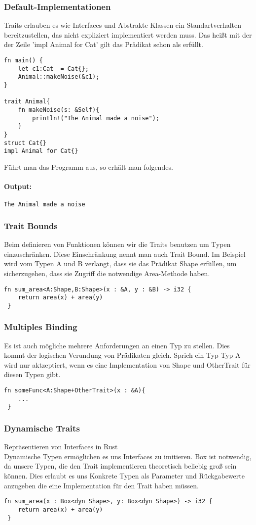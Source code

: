 \documentclass[a4paper, 1ppt]{article}
\begin{document}
\subsubsection{Default-Implementationen}
Traits erlauben es wie Interfaces und Abstrakte Klassen ein Standartverhalten bereitzustellen, das nicht expliziert implementiert werden muss.
Das heißt mit der der Zeile 'impl Animal for Cat{}' gilt das Prädikat schon als erfüllt.
\begin{verbatim}
fn main() {
    let c1:Cat  = Cat{};
    Animal::makeNoise(&c1);
}

trait Animal{
    fn makeNoise(s: &Self){
        println!("The Animal made a noise");
    }
}
struct Cat{}
impl Animal for Cat{}
\end{verbatim}
Führt man das Programm aus, so erhält man folgendes.
\paragraph{Output:}
\begin{verbatim}
The Animal made a noise
\end{verbatim}
\subsubsection{Trait Bounds}
Beim definieren von Funktionen können wir die Traits benutzen um Typen einzuschränken. Diese Einschränkung nennt man auch Trait Bound.
Im Beispiel wird vom Typen A und B  verlangt, dass sie das Prädikat Shape erfüllen, um sicherzugehen, dass sie Zugriff die notwendige Area-Methode haben.
\begin{verbatim}
fn sum_area<A:Shape,B:Shape>(x : &A, y : &B) -> i32 {
    return area(x) + area(y)
 }
\end{verbatim}
\subsubsection{Multiples Binding}
Es ist auch mögliche mehrere Anforderungen an einen Typ zu stellen.
Dies kommt der logischen Verundung von Prädikaten gleich.
Sprich ein Typ Typ A wird nur aktzeptiert, wenn es eine Implementation von Shape und OtherTrait für diesen Typen gibt.
\begin{verbatim}
fn someFunc<A:Shape+OtherTrait>(x : &A){
	...
 }
\end{verbatim}
\subsubsection{Dynamische Traits}
Repräsentieren von Interfaces in Rust \\
Dynamische Typen ermöglichen es uns Interfaces zu imitieren.
Box ist notwendig, da unsere Typen, die den Trait implementieren theoretisch beliebig groß sein können.
Dies erlaubt es uns Konkrete Typen als Parameter und Rückgabewerte anzugeben die eine Implementation für den Trait haben müssen.
\begin{verbatim}
fn sum_area(x : Box<dyn Shape>, y: Box<dyn Shape>) -> i32 {
    return area(x) + area(y)
 }
\end{verbatim}
\end{document}
